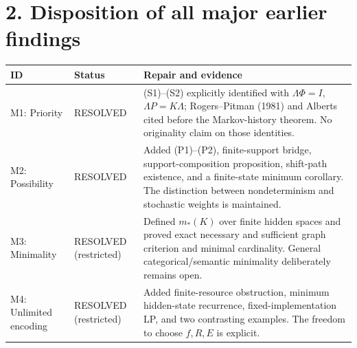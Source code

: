 \documentclass[11pt,letterpaper]{article}
\begin{document}
\section*{2. Disposition of all major earlier findings}
\renewcommand{\arraystretch}{1.25}
\begin{tabularx}{\textwidth}{@{}p{}p{}X@{}}
\toprule
\textbf{ID} & \textbf{Status} & \textbf{Repair and evidence}\\\midrule
M1: Priority & RESOLVED & (S1)--(S2) explicitly identified with $\Lambda\Phi=I$, $\Lambda P=K\Lambda$; Rogers--Pitman (1981) and Alberts cited before the Markov-history theorem. No originality claim on those identities.\\
M2: Possibility & RESOLVED & Added (P1)--(P2), finite-support bridge, support-composition proposition, shift-path existence, and a finite-state minimum corollary. The distinction between nondeterminism and stochastic weights is maintained.\\
M3: Minimality & RESOLVED (restricted) & Defined $m_*(K)$ over finite hidden spaces and proved exact necessary and sufficient graph criterion and minimal cardinality. General categorical/semantic minimality deliberately remains open.\\
M4: Unlimited encoding & RESOLVED (restricted) & Added finite-resource obstruction, minimum hidden-state recurrence, fixed-implementation LP, and two contrasting examples. The freedom to choose $f,R,E$ is explicit.\\
\bottomrule
\end{tabularx}
\end{document}
